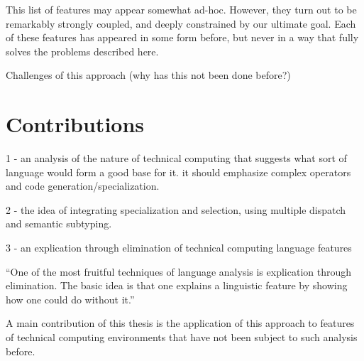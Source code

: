 This list of features may appear somewhat ad-hoc. However, they turn out to be
remarkably strongly coupled, and deeply constrained by our ultimate goal.
Each of these features has appeared in some form before, but never in a way
that fully solves the problems described here.

Challenges of this approach (why has this not been done before?)


\section{Contributions}

1 - an analysis of the nature of technical computing that suggests what
sort of language would form a good base for it. it should emphasize
complex operators and code generation/specialization.

2 - the idea of integrating specialization and selection, using multiple dispatch
and semantic subtyping.

3 - an explication through elimination of technical computing language features

``One of the most fruitful techniques of language analysis is explication through
elimination. The basic idea is that one explains a linguistic feature by showing
how one could do without it.'' \cite{morris}

A main contribution of this thesis is the application of this approach to features
of technical computing environments that have not been subject to such analysis
before.
